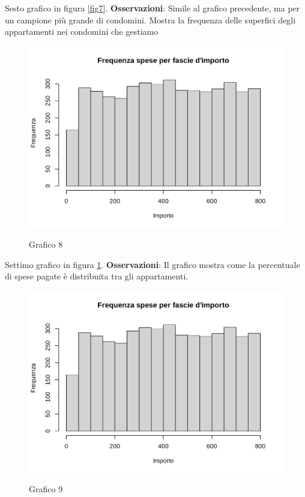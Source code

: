 Sesto grafico in figura \ref{fig7}. \textbf{Osservazioni}: Simile al grafico precedente, ma per un campione più grande di condomini. Mostra la frequenza delle superfici degli appartamenti nei condomini che gestiamo


\clearpage

\begin{figure}[t]
	\caption{Grafico 8}
	\includegraphics[page=8,width=\textwidth]{../R/grafici.pdf}
	\label{fig8}
\end{figure}

Settimo grafico in figura \ref{fig8}. \textbf{Osservazioni}: Il grafico mostra come la percentuale di spese pagate è distribuita tra gli appartamenti.

\clearpage

\begin{figure}[t]
	\caption{Grafico 9}
	\includegraphics[page=9,width=\textwidth]{../R/grafici.pdf}
	\label{fig9}
\end{figure}


